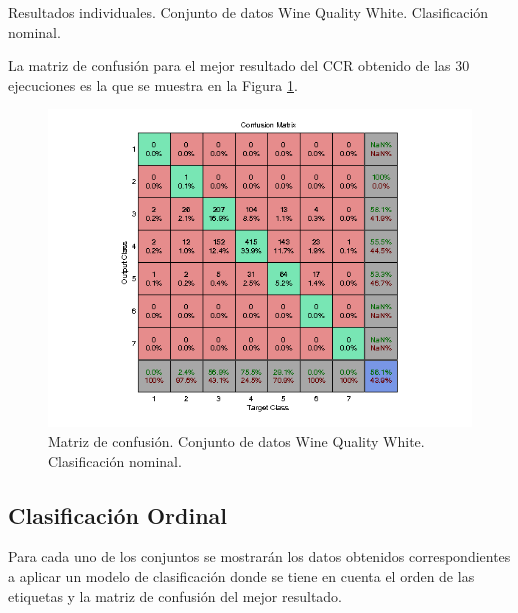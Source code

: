 			\begin{table}[!htbp]
				\centering
				\caption{Resultados individuales. Conjunto de datos Wine Quality White. Clasificación nominal.}
				\label{tab:nomwhi}
			\end{table}
			
			La matriz de confusión para el mejor resultado del CCR obtenido de las 30 ejecuciones es la que se muestra en la Figura \ref{fig:nomwhi}.
			
			\begin{figure}[htbp]
				\centering
				\includegraphics[scale=0.8]{../src/results/nominal/winequality-white_mc14.png}
				\caption{Matriz de confusión. Conjunto de datos Wine Quality White. Clasificación nominal.}
				\label{fig:nomwhi}
			\end{figure}
		
		\subsection{Clasificación Ordinal}
		
			Para cada uno de los conjuntos se mostrarán los datos obtenidos correspondientes a aplicar un modelo de clasificación donde se tiene en cuenta el orden de las etiquetas y la matriz de confusión del mejor resultado.
	
